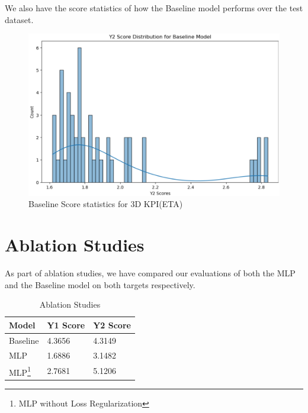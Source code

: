 \documentclass{report} %
\begin{document}
We also have the score statistics of how the Baseline model performs over the test dataset.\\

\begin{figure}[H]
    \centering
    \includegraphics[width=1\textwidth]{./ReportImages/score_baseline_y2.png} 
    \caption{Baseline Score statistics for 3D KPI(ETA)} 
    \label{fig:Baseline Score statistics for 3D KPI(ETA)}
\end{figure}


\section{Ablation Studies}\label{sec:Ablation Studies}

As part of ablation studies, we have compared our evaluations of both the \ac{MLP} and the Baseline model on both targets respectively.

\begin{minipage}[t]{\textwidth}
    \begin{table}[H]
        \centering
        \begin{tabular}{|l|l|l|}
        \hline {\bf Model} & {\bf Y1 Score} & {\bf Y2 Score}\\
        \hline 
        Baseline & 4.3656 & 4.3149 \\
        MLP & 1.6886 & 3.1482 \\
        MLP\footnote{\centering MLP without Loss Regularization}  & 2.7681 &  5.1206 \\
        \hline
        \end{tabular}
        \caption{Ablation Studies}
        \label{tab:Ablation Studies}
    \end{table}
\end{minipage}
\end{document}
